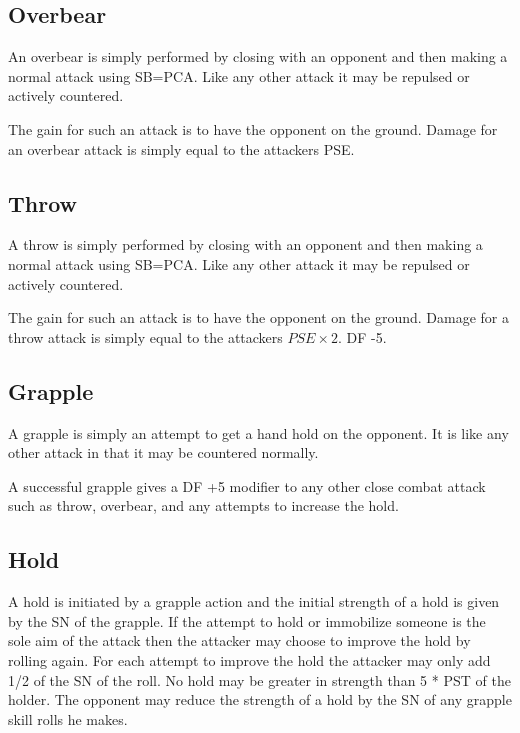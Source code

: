 \subsection{Overbear}

An overbear is simply performed by closing with an opponent and then
making a normal attack using SB=PCA. Like any other attack it may be
repulsed or actively countered.

The gain for such an attack is to have the opponent on the ground.
Damage for an overbear attack is simply equal to the attackers PSE.

\subsection{Throw}

A throw is simply performed by closing with an opponent and then
making a normal attack using SB=PCA. Like any other attack it may be
repulsed or actively countered.

The gain for such an attack is to have the opponent on the ground.
Damage for a throw attack is simply equal to the attackers \( PSE \times 2\).
DF -5.

\subsection{Grapple}

A grapple is simply an attempt to get a hand hold on the opponent.
It is like any other attack in that it may be countered normally.

A successful grapple gives a DF +5 modifier to any other close combat
attack such as throw, overbear, and any attempts to increase the hold.

\subsection{Hold}

A hold is initiated by a grapple action and the initial strength of a
hold is given by the SN of the grapple. If the attempt to hold or
immobilize someone is the sole aim of the attack then the attacker
may choose to improve the hold by rolling again. For each attempt to
improve the hold the attacker may only add 1/2 of the SN of the roll.
No hold may be greater in strength than 5 * PST of the holder.
The opponent may reduce the strength of a hold by the SN of any
grapple skill rolls he makes.


